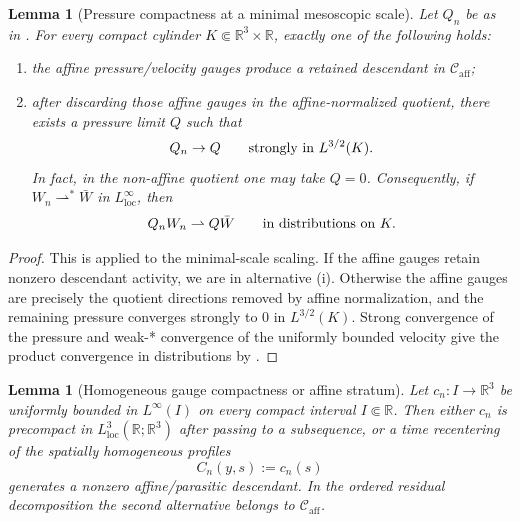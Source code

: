 \documentclass[11pt]{amsart}
\numberwithin{equation}{section}
\theoremstyle{plain}
\newtheorem{lemma}[theorem]{Lemma}
\theoremstyle{definition}
\theoremstyle{remark}
\newcommand{\loc}{\mathrm{loc}}
\newcommand{\Caff}{\mathcal C_{\mathrm{aff}}}
\begin{document}
\begin{lemma}[Pressure compactness at a minimal mesoscopic scale]
\label{lem:first-bad-pressure-compactness}
Let \(Q_n\) be as in .  For every compact
cylinder \(K\Subset\mathbb R^3\times\mathbb R\), exactly one of the following
holds:
\begin{enumerate}[label=\textup{(\roman*)}]
   \item the affine pressure/velocity gauges produce a retained descendant in
   \(\Caff\);
   \item after discarding those affine gauges in the affine-normalized quotient,
   there exists a pressure limit \(Q\) such that
\[
   Q_n\to Q
   \qquad\hbox{strongly in }L^{3/2}(K).
\]
   In fact, in the non-affine quotient one may take \(Q=0\).  Consequently, if
   \(W_n\rightharpoonup^\ast \bar W\) in \(L^\infty_{\loc}\), then
\[
   Q_nW_n\rightharpoonup Q\bar W
   \qquad\hbox{in distributions on }K .
\]
\end{enumerate}
\end{lemma}

\begin{proof}
This is  applied to the
minimal-scale scaling.  If the affine gauges retain nonzero descendant activity,
we are in alternative \textup{(i)}.  Otherwise the affine gauges are precisely
the quotient directions removed by affine normalization, and the remaining
pressure converges strongly to \(0\) in \(L^{3/2}(K)\).  Strong convergence of
the pressure and weak-* convergence of the uniformly bounded velocity give the
product convergence in distributions by
.
\end{proof}

\begin{lemma}[Homogeneous gauge compactness or affine stratum]
\label{lem:homogeneous-gauge-compactness}
Let \(c_n:I\to\mathbb R^3\) be uniformly bounded in \(L^\infty(I)\) on every
compact interval \(I\Subset\mathbb R\).  Then either \(c_n\) is precompact in
\(L^3_{\loc}(\mathbb R;\mathbb R^3)\) after passing to a subsequence, or a
time recentering of the spatially homogeneous profiles
\[
   C_n(y,s):=c_n(s)
\]
generates a nonzero affine/parasitic descendant.  In the ordered residual
decomposition the second alternative belongs to \(\Caff\).
\end{lemma}
\end{document}
